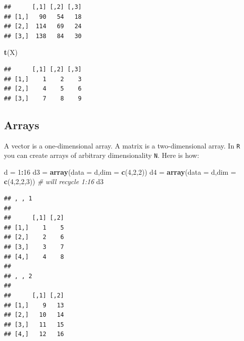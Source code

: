 \documentclass[]{book}
\newenvironment{Shaded}{\begin{snugshade}}{\end{snugshade}}
\newcommand{\KeywordTok}[1]{\textcolor[rgb]{0.13,0.29,0.53}{\textbf{#1}}}
\newcommand{\DataTypeTok}[1]{\textcolor[rgb]{0.13,0.29,0.53}{#1}}
\newcommand{\DecValTok}[1]{\textcolor[rgb]{0.00,0.00,0.81}{#1}}
\newcommand{\StringTok}[1]{\textcolor[rgb]{0.31,0.60,0.02}{#1}}
\newcommand{\CommentTok}[1]{\textcolor[rgb]{0.56,0.35,0.01}{\textit{#1}}}
\newcommand{\OperatorTok}[1]{\textcolor[rgb]{0.81,0.36,0.00}{\textbf{#1}}}
\newcommand{\NormalTok}[1]{#1}
\begin{document}
\begin{Shaded}
\end{Shaded}

\begin{verbatim}
##      [,1] [,2] [,3]
## [1,]   90   54   18
## [2,]  114   69   24
## [3,]  138   84   30
\end{verbatim}

\begin{Shaded}
\begin{Highlighting}[]
\KeywordTok{t}\NormalTok{(X)}
\end{Highlighting}
\end{Shaded}

\begin{verbatim}
##      [,1] [,2] [,3]
## [1,]    1    2    3
## [2,]    4    5    6
## [3,]    7    8    9
\end{verbatim}

\subsection{Arrays}\label{arrays}

A vector is a one-dimensional array. A matrix is a two-dimensional
array. In \texttt{R} you can create arrays of arbitrary dimensionality
\texttt{N}. Here is how:

\begin{Shaded}
\begin{Highlighting}[]
\NormalTok{d =}\StringTok{ }\DecValTok{1}\OperatorTok{:}\DecValTok{16}
\NormalTok{d3 =}\StringTok{ }\KeywordTok{array}\NormalTok{(}\DataTypeTok{data =}\NormalTok{ d,}\DataTypeTok{dim =} \KeywordTok{c}\NormalTok{(}\DecValTok{4}\NormalTok{,}\DecValTok{2}\NormalTok{,}\DecValTok{2}\NormalTok{))}
\NormalTok{d4 =}\StringTok{ }\KeywordTok{array}\NormalTok{(}\DataTypeTok{data =}\NormalTok{ d,}\DataTypeTok{dim =} \KeywordTok{c}\NormalTok{(}\DecValTok{4}\NormalTok{,}\DecValTok{2}\NormalTok{,}\DecValTok{2}\NormalTok{,}\DecValTok{3}\NormalTok{))  }\CommentTok{# will recycle 1:16}
\NormalTok{d3}
\end{Highlighting}
\end{Shaded}

\begin{verbatim}
## , , 1
## 
##      [,1] [,2]
## [1,]    1    5
## [2,]    2    6
## [3,]    3    7
## [4,]    4    8
## 
## , , 2
## 
##      [,1] [,2]
## [1,]    9   13
## [2,]   10   14
## [3,]   11   15
## [4,]   12   16
\end{verbatim}
\end{document}
